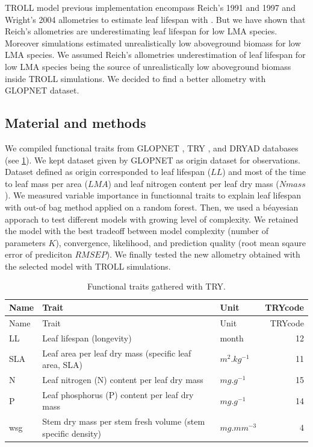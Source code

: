 \documentclass[12pt,]{article}
\theoremstyle{definition}
\theoremstyle{definition}
\theoremstyle{remark}
\begin{document}
TROLL model previous implementation encompass Reich's 1991 and 1997 and
Wright's 2004 allometries to estimate leaf lifespan with
\citep{Reich1991a, Reich1997, wright_worldwide_2004}. But we have shown
that Reich's allometries are underestimating leaf lifespan for low LMA
species. Moreover simulations estimated unrealistically low aboveground
biomass for low LMA species. We assumed Reich's allometries
underestimation of leaf lifespan for low LMA species being the source of
unrealistically low aboveground biomass inside TROLL simulations. We
decided to find a better allometry with \citet{wright_worldwide_2004}
GLOPNET dataset.

\subsection{Material and methods}\label{material-and-methods-1}

We compiled functional traits from GLOPNET
\citep{wright_worldwide_2004}, TRY \citep{Kattge2011}, and DRYAD
\citep{chave_towards_2009} databases (see \ref{tab:A2traits}). We kept
dataset given by GLOPNET as origin dataset for observations. Dataset
defined as origin corresponded to leaf lifespan (\(LL\)) and most of the
time to leaf mass per area (\(LMA\)) and leaf nitrogen content per leaf
dry mass (\(Nmass\)). We measured variable importance in functionnal
traits to explain leaf lifespan with out-of bag method applied on a
random forest. Then, we used a béayesian apporach to test different
models with growing level of complexity. We retained the model with the
best tradeoff between model complexity (number of parameters \(K\)),
convergence, likelihood, and prediction quality (root mean sqaure error
of prediciton \(RMSEP\)). We finally tested the new allometry obtained
with the selected model with TROLL simulations.

\begin{longtable}[]{@{}lllr@{}}
\caption{\label{tab:A2traits}Functional traits gathered with
TRY.}\tabularnewline
\toprule
Name & Trait & Unit & TRYcode\tabularnewline
\midrule
\endfirsthead
\toprule
Name & Trait & Unit & TRYcode\tabularnewline
\midrule
\endhead
LL & Leaf lifespan (longevity) & month & 12\tabularnewline
SLA & Leaf area per leaf dry mass (specific leaf area, SLA) &
\(m^2.kg^{-1}\) & 11\tabularnewline
N & Leaf nitrogen (N) content per leaf dry mass & \(mg.g^{-1}\) &
15\tabularnewline
P & Leaf phosphorus (P) content per leaf dry mass & \(mg.g^{-1}\) &
14\tabularnewline
wsg & Stem dry mass per stem fresh volume (stem specific density) &
\(mg.mm^{-3}\) & 4\tabularnewline
\bottomrule
\end{longtable}
\end{document}
